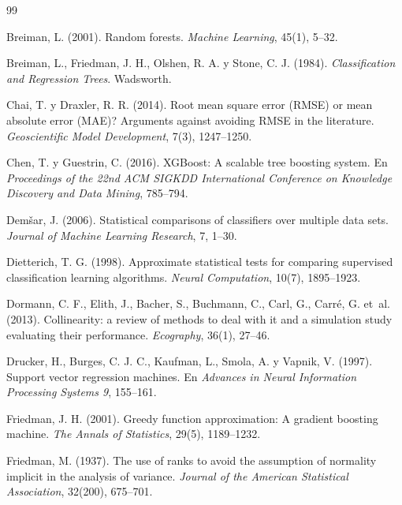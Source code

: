 \documentclass[11pt,a4paper]{article}
\begin{document}
\begin{thebibliography}{99}

Breiman, L. (2001). Random forests. \textit{Machine Learning}, 45(1), 5--32.

Breiman, L., Friedman, J. H., Olshen, R. A. y Stone, C. J. (1984). \textit{Classification and Regression Trees}. Wadsworth.

Chai, T. y Draxler, R. R. (2014). Root mean square error (RMSE) or mean absolute error (MAE)? Arguments against avoiding RMSE in the literature. \textit{Geoscientific Model Development}, 7(3), 1247--1250.

Chen, T. y Guestrin, C. (2016). XGBoost: A scalable tree boosting system. En \textit{Proceedings of the 22nd ACM SIGKDD International Conference on Knowledge Discovery and Data Mining}, 785--794.

Dem{\v{s}}ar, J. (2006). Statistical comparisons of classifiers over multiple data sets. \textit{Journal of Machine Learning Research}, 7, 1--30.

Dietterich, T. G. (1998). Approximate statistical tests for comparing supervised classification learning algorithms. \textit{Neural Computation}, 10(7), 1895--1923.

Dormann, C. F., Elith, J., Bacher, S., Buchmann, C., Carl, G., Carré, G. et~al. (2013). Collinearity: a review of methods to deal with it and a simulation study evaluating their performance. \textit{Ecography}, 36(1), 27--46.

Drucker, H., Burges, C. J. C., Kaufman, L., Smola, A. y Vapnik, V. (1997). Support vector regression machines. En \textit{Advances in Neural Information Processing Systems 9}, 155--161.

Friedman, J. H. (2001). Greedy function approximation: A gradient boosting machine. \textit{The Annals of Statistics}, 29(5), 1189--1232.

Friedman, M. (1937). The use of ranks to avoid the assumption of normality implicit in the analysis of variance. \textit{Journal of the American Statistical Association}, 32(200), 675--701.


\end{thebibliography}
\end{document}

